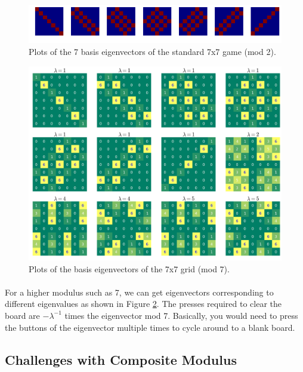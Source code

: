 \documentclass[11pt]{article}
\begin{document}
\begin{figure}
\caption{Plots of the 7 basis eigenvectors of the standard 7x7 game (mod 2).}
\label{eigbasis77}
\includegraphics[width=\textwidth]{eigbasis77.png}
\end{figure}


\begin{figure}
\caption{Plots of the basis eigenvectors of the 7x7 grid (mod 7).}
\label{eig777all}
\includegraphics[width=\textwidth]{eig777all.png}
\end{figure}

\paragraph{} For a higher modulus such as 7, we can get eigenvectors corresponding to different eigenvalues as shown in Figure \ref{eig777all}.  The presses required to clear the board are $-\lambda^{-1}$ times the eigenvector mod 7.  Basically, you would need to press the buttons of the eigenvector multiple times to cycle around to a blank board.

\subsection*{Challenges with Composite Modulus}
\end{document}
